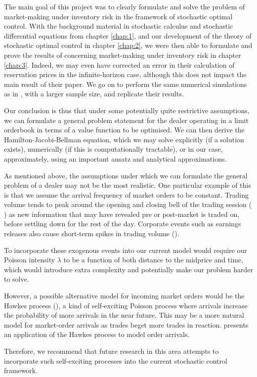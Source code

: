 The main goal of this project was to clearly formulate and solve the problem of 
market-making under inventory risk in the framework of stochastic optimal control.
With the background material in stochastic calculus and stochastic differential 
equations from chapter \ref{chap:1}, and our development of the theory of 
stochastic optimal control in chapter \ref{chap:2}, we were then able to formulate 
and prove the results of \cite{AS2008} concerning market-making under inventory 
risk in chapter \ref{chap:3}. Indeed, we may even have corrected an error in their calculation
of reservation prices in the infinite-horizon case, although this does not impact the 
main result of their paper. We go on to perform the same numerical simulations as 
in \cite{AS2008}, with a larger sample size, and replicate their results.

Our conclusion is thus that under some potentially quite restrictive assumptions,
we can formulate a general problem statement for the dealer operating in a limit 
orderbook in terms of a value function to be optimised. We can then derive the 
Hamilton-Jacobi-Bellman equation, which we may solve explicitly (if a solution exists),
numerically (if this is computationally tractable), or in our case, approximately, using 
an important ansatz and analytical approximations.

As mentioned above, the assumptions under which we can formulate the general 
problem of a dealer may not be the most realistic. One particular example of this 
is that we assume the arrival frequency of market orders to be constant. Trading volume 
tends to peak around the opening and closing bell of the trading session (
\cite{volume}) as new information that may have revealed pre or post-market is traded
on, before settling down for the rest of the day. Corporate events such as earnings 
releases also cause short-term spikes in trading volume (\cite{EarningsPremium}). 

To incorporate these exogenous events into our current model would require our Poisson 
intensity $\lambda$ to be a function of both distance to the midprice and time, which 
would introduce extra complexity and potentially make our problem harder to solve. 

However, a possible alternative model for incoming market orders would be the Hawkes process
(\cite{Hawkes}), a kind of self-exciting Poisson process where arrivals increase the 
probability of more arrivals in the near future. This may be a more natural model for 
market-order arrivals as trades beget more trades in reaction. \cite{Hawkes2}
presents an application of the Hawkes process to model order arrivals. 

Therefore, we recommend that future research in this area attempts to incorporate 
such self-exciting processes into the current stochastic control framework.
